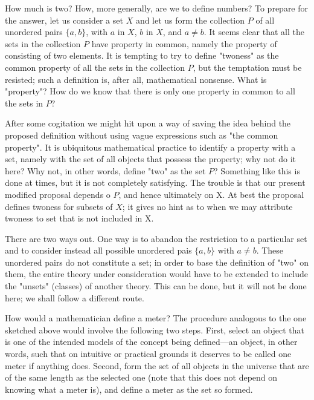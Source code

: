 How much is two? How, more generally, are we to define numbers? To prepare for the answer, let us consider a set $X$ and let us form the collection $P$ of all unordered pairs $\{ a, b \}$, with $a$ in $X$, $b$ in $X$, and $a \neq b$. It seems clear that all the sets in the collection $P$ have property in common, namely the property of consisting of two elements. It is tempting to try to define "twoness" as the common property of all the sets in the collection $P$, but the temptation must be resisted; such a definition is, after all, mathematical nonsense. What is "property"? How do we know that there is only one property in common to all the sets in $P$? 

After some cogitation we might hit upon a way of saving the idea behind the proposed definition without using vague expressions such as "the common property". It is ubiquitous  mathematical  practice to identify a property with a set, namely with the set of all objects that possess the property; why not do it here? Why not, in other words, define "two" as the set $P$? Something like this is done at times, but it is not completely satisfying. The trouble is that our present modified proposal depends o $P$, and hence ultimately on X. At best the proposal defines twoness for subsets of $X$; it gives no hint as to when we may attribute twoness to set that is not included in X. 

There are two ways out. One way is to abandon the restriction to a particular set and to consider instead all possible unordered pais $\{ a, b \}$ with $a \neq b$. These unordered pairs do not constitute a set; in order to base the definition of "two" on them, the entire theory under consideration would have to be extended to include the "unsets" (classes) of another theory. This can be done, but it will not be done here; we shall follow a different route. 

How would a mathematician define a meter? The procedure analogous to the one sketched above would involve the following two steps. First, select an object that is one of the intended models of the concept being defined—an object, in other words, such that on intuitive or practical grounds it deserves to be called one meter if anything does. Second, form the set of all objects in the universe that are of the same length as the selected one (note that this does not depend on knowing what a meter is), and define a meter as the set so formed. 

